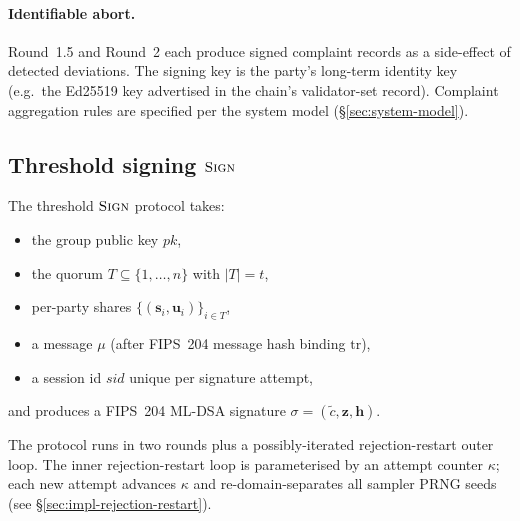 \documentclass[11pt,a4paper]{article}
\theoremstyle{definition}
\theoremstyle{remark}
\newcommand{\Sign}{\textsc{Sign}}
\begin{document}
\paragraph{Identifiable abort.}
Round~1.5 and Round~2 each produce signed complaint records as a
side-effect of detected deviations. The signing key is the party's
long-term identity key (e.g.\ the Ed25519 key advertised in the
chain's validator-set record). Complaint aggregation rules are
specified per the system model (\S\ref{sec:system-model}).

\subsection{Threshold signing \texorpdfstring{$\Sign$}{Sign}}
\label{sec:sign}

The threshold $\Sign$ protocol takes:

\begin{itemize}[leftmargin=*, itemsep=0pt]
\item the group public key $\mathit{pk}$,
\item the quorum $T \subseteq \{1, \dots, n\}$ with $|T| = t$,
\item per-party shares $\{(\mathbf{s}_i, \mathbf{u}_i)\}_{i \in T}$,
\item a message $\mu$ (after FIPS~204 message hash binding $\mathrm{tr}$),
\item a session id $\mathit{sid}$ unique per signature attempt,
\end{itemize}

and produces a FIPS~204 ML-DSA signature
$\sigma = (\tilde c, \mathbf{z}, \mathbf{h})$.

The protocol runs in two rounds plus a possibly-iterated rejection-restart
outer loop. The inner rejection-restart loop is parameterised by an
attempt counter $\kappa$; each new attempt advances $\kappa$ and
re-domain-separates all sampler PRNG seeds (see
\S\ref{sec:impl-rejection-restart}).
\end{document}
